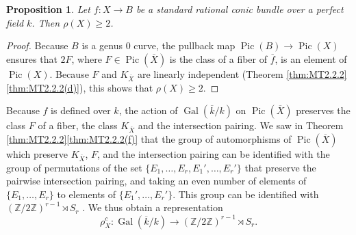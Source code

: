 \documentclass[a4paper, 11pt, reqno]{amsart}
\numberwithin{equation}{section} \numberwithin{figure}{section}
\DeclareMathOperator{\Pic}{Pic}
\DeclareMathOperator{\Gal}{Gal}
\def \Z {{\mathbb Z}}
\newcommand{\ra}{\rightarrow}
\newtheorem{proposition}[lemma]{Proposition}
\theoremstyle{definition}
\numberwithin{lemma}{section}
\begin{document}
\begin{proposition}\label{prop:picconicbundle}
    Let $f \colon X \ra B$ be a standard rational conic bundle over a perfect field $k$. Then $\rho(X) \geq 2$.
\end{proposition}

\begin{proof}
    Because $B$ is a genus 0 curve, the pullback map $\Pic(B) \ra \Pic(X)$ ensures that $2F$, where $F \in \Pic(\overline{X})$ is the class of a fiber of $\overline{f}$, is an element of $\Pic(X)$. Because $F$ and $K_{\overline{X}}$ are linearly independent (Theorem \ref{thm:MT2.2.2}\ref{thm:MT2.2.2(d)}), this shows that $\rho(X) \geq 2$.
\end{proof}

Because $f$ is defined over $k$, the action of $\Gal(\overline{k}/k)$ on $\Pic(\overline{X})$ preserves the class $F$ of a fiber, the class $K_{\overline{X}}$ and the intersection pairing. We saw in Theorem \ref{thm:MT2.2.2}\ref{thm:MT2.2.2(f)} that the group of automorphisms of $\Pic(\overline{X})$ which preserve $K_{\overline{X}}$, $F$, and the intersection pairing can be identified with the group of permutations of the set $\{E_1, \ldots, E_r, E_1', \ldots, E_r'\}$ that preserve the pairwise intersection pairing, and taking an even number of elements of $\{E_1, \ldots, E_r\}$ to elements of $\{E_1', \ldots, E_r'\}$. This group can be identified with $(\Z/2\Z)^{r-1} \rtimes S_r$ \cite[Proof of Proposition 0.4]{KunyavskiiTsfasman}. We thus obtain a representation 
\begin{equation}\label{eq:galoisrep}
    \rho_X^c \colon \Gal(\overline{k} / k) \ra (\Z/2\Z)^{r-1} \rtimes S_r. 
\end{equation}
\end{document}
